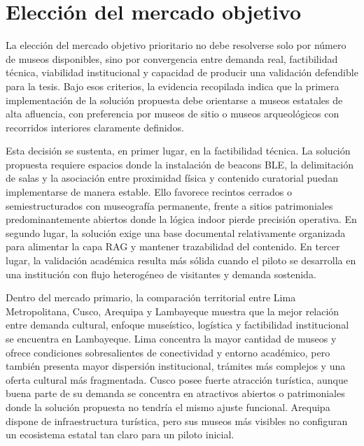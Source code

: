 \section{Elección del mercado objetivo}

La elección del mercado objetivo prioritario no debe resolverse solo por número de museos disponibles, sino por convergencia entre demanda real, factibilidad técnica, viabilidad institucional y capacidad de producir una validación defendible para la tesis. Bajo esos criterios, la evidencia recopilada indica que la primera implementación de la solución propuesta debe orientarse a museos estatales de alta afluencia, con preferencia por museos de sitio o museos arqueológicos con recorridos interiores claramente definidos.

Esta decisión se sustenta, en primer lugar, en la factibilidad técnica. La solución propuesta requiere espacios donde la instalación de beacons BLE, la delimitación de salas y la asociación entre proximidad física y contenido curatorial puedan implementarse de manera estable. Ello favorece recintos cerrados o semiestructurados con museografía permanente, frente a sitios patrimoniales predominantemente abiertos donde la lógica indoor pierde precisión operativa. En segundo lugar, la solución exige una base documental relativamente organizada para alimentar la capa RAG y mantener trazabilidad del contenido. En tercer lugar, la validación académica resulta más sólida cuando el piloto se desarrolla en una institución con flujo heterogéneo de visitantes y demanda sostenida.

Dentro del mercado primario, la comparación territorial entre Lima Metropolitana, Cusco, Arequipa y Lambayeque muestra que la mejor relación entre demanda cultural, enfoque museístico, logística y factibilidad institucional se encuentra en Lambayeque. Lima concentra la mayor cantidad de museos y ofrece condiciones sobresalientes de conectividad y entorno académico, pero también presenta mayor dispersión institucional, trámites más complejos y una oferta cultural más fragmentada. Cusco posee fuerte atracción turística, aunque buena parte de su demanda se concentra en atractivos abiertos o patrimoniales donde la solución propuesta no tendría el mismo ajuste funcional. Arequipa dispone de infraestructura turística, pero sus museos más visibles no configuran un ecosistema estatal tan claro para un piloto inicial.

